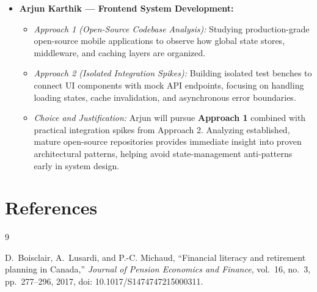 \documentclass[12pt]{article}
\begin{document}
\begin{enumerate}
\begin{itemize}
    \item \textbf{Arjun Karthik --- Frontend System Development:}
    \begin{itemize}
      \item \textit{Approach 1 (Open-Source Codebase Analysis):} Studying production-grade open-source mobile applications to observe how global state stores, middleware, and caching layers are organized.
      \item \textit{Approach 2 (Isolated Integration Spikes):} Building isolated test benches to connect UI components with mock API endpoints, focusing on handling loading states, cache invalidation, and asynchronous error boundaries.
      \item \textit{Choice and Justification:} Arjun will pursue \textbf{Approach 1} combined with practical integration spikes from Approach 2. Analyzing established, mature open-source repositories provides immediate insight into proven architectural patterns, helping avoid state-management anti-patterns early in system design.
    \end{itemize}
  \end{itemize}
\end{enumerate}


\newpage{}
\section{References}
\begin{thebibliography}{9}

D.~Boisclair, A.~Lusardi, and P.-C. Michaud, ``Financial literacy and
retirement planning in Canada,'' \emph{Journal of Pension Economics and
Finance}, vol.~16, no.~3, pp.~277--296, 2017,
doi: 10.1017/S1474747215000311.

\end{thebibliography}
\end{document}
